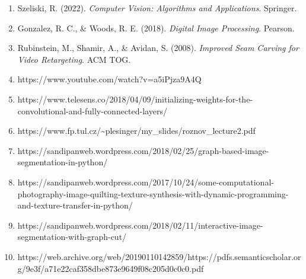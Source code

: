 \documentclass[11pt]{article}
\begin{document}
\begin{enumerate}
  Avidan, S., \& Shamir, A. (2007). \emph{Seam Carving for Content-Aware
  Image Resizing}. \textbf{ACM Transactions on Graphics}, 26(3).
\item
  Szeliski, R. (2022). \emph{Computer Vision: Algorithms and
  Applications}. Springer.
\item
  Gonzalez, R. C., \& Woods, R. E. (2018). \emph{Digital Image
  Processing}. Pearson.
\item
  Rubinstein, M., Shamir, A., \& Avidan, S. (2008). \emph{Improved Seam
  Carving for Video Retargeting}. ACM TOG.
\item
  https://www.youtube.com/watch?v=a5iPjza9A4Q
\item
  https://www.telesens.co/2018/04/09/initializing-weights-for-the-convolutional-and-fully-connected-layers/
\item
  https://www.fp.tul.cz/\textasciitilde plesinger/my\_slides/roznov\_lecture2.pdf
\item
  https://sandipanweb.wordpress.com/2018/02/25/graph-based-image-segmentation-in-python/
\item
  https://sandipanweb.wordpress.com/2017/10/24/some-computational-photography-image-quilting-texture-synthesis-with-dynamic-programming-and-texture-transfer-in-python/
\item
  https://sandipanweb.wordpress.com/2018/02/11/interactive-image-segmentation-with-graph-cut/
\item
  https://web.archive.org/web/20190110142859/https://pdfs.semanticscholar.org/9e3f/a71e22caf358dbe873e9649f08c205d0c0c0.pdf
\end{enumerate}


    
    
    
\end{document}
